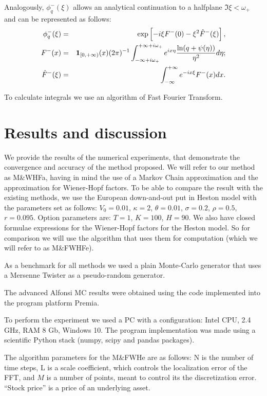 \documentclass[a4paper]{jpconf}
\begin{document}
Analogously, $\phi^-_q(\xi)$ allows an analytical continuation to a halfplane $\Im \xi<\omega_+$ and can be represented as follows:
\begin{eqnarray*}
	\phi^-_q(\xi)&=&\exp\left[-i\xi F^-(0)-\xi^2\hat{F}^-(\xi)\right],\\
	F^-(x)&=&{\bf 1}_{[0,+\infty)}(x)(2\pi)^{-1}
	\int_{-\infty+i\omega_+}^{+\infty+i\omega_+}e^{ix\eta}\frac{\ln(q+\psi(\eta))}
	{\eta^2}d\eta;\\
	\hat{F}^-(\xi)&=&\int_{-\infty}^{+\infty}e^{-ix\xi}F^-(x)dx.
\end{eqnarray*}

To calculate integrals we use an algorithm of Fast Fourier Transform.

\section{Results and discussion}

We provide the results of the numerical experiments, that demonstrate the convergence and accuracy of the method proposed. We will refer to our method as M\&WHFa, having in mind the use of a Markov Chain approximation and the approximation for Wiener-Hopf factors. To be able to compare the result with the existing methods, we use the European down-and-out put in Heston model with the parameters set as follows: $V_0=0.01$, $\kappa=2$, $\theta=0.01$, $\sigma=0.2$, $\rho=0.5 $, $r=0.095$. Option parameters are: $T=1$, $K=100$, $H=90$.
We also have closed formulae expressions for the Wiener-Hopf factors for the Heston model. So for comparison we will use the algorithm \cite{kudr_rod} that uses them for computation (which we will refer to as M\&FWHFe).

As a benchmark for all methods we used a plain Monte-Carlo generator that uses a Mersenne Twister as a pseudo-random generator. 

The advanced Alfonsi \cite{alfonsi} MC results were obtained using the code implemented into the program platform Premia.

To perform the experiment we used a PC with a configuration: Intel CPU, 2.4 GHz, RAM 8 Gb, Windows 10. The program implementation was made using a scientific Python stack (numpy, scipy and pandas packages).

The algorithm parameters for the M\&FWHe are as follows: N is the number of time steps, L is a scale coefficient, which controls the localization error of the FFT, and $M$ is a number of points, meant to control its the discretization error. ``Stock price'' is a price of an underlying asset.
\end{document}
